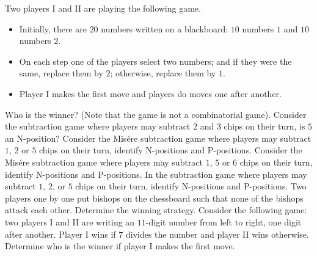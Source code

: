 \begin{chapterendexercises}
  \exercise
    Two players I and II are playing the following game.
    \begin{itemize}
      \item Initially, there are $20$ numbers written on a blackboard:
        $10$ numbers $1$ and $10$ numbers $2$.
      \item On each step one of the players select two numbers;
        and if they were the same, replace them by $2$;
        otherwise, replace them by $1$.
      \item Player I makes the first move and players do moves one
        after another.
    \end{itemize}
    Who is the winner? (Note that the game is not a combinatorial game).
  \exercise Consider the subtraction game where players may subtract $2$ and $3$
    chips on their turn, is $5$ an N-position?
  \exercise Consider the Mis\'ere subtraction game where players may subtract
    $1$, $2$ or $5$ chips on their turn, identify N-positions and
    P-positions.
  \exercise Consider the Mis\'ere subtraction game where players may subtract
    $1$, $5$ or $6$ chips on their turn, identify N-positions and
    P-positions.
  \exercise
    In the subtraction game where players may subtract $1$, $2$, or $5$ chips
    on their turn, identify N-positions and P-positions.
  \exercise Two players one by one put bishops on the chessboard such that none
    of the bishops attack each other. Determine the winning strategy.
  \exercise Consider the following game: two players I and II are writing an
    $11$-digit number from left to right, one digit after another. Player I
    wins  if $7$ divides the number and player II wins otherwise.
    Determine who is the winner if player I makes the first move.
\end{chapterendexercises}
